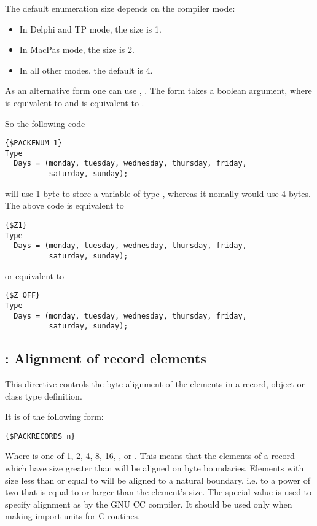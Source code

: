 The default enumeration size depends on the compiler mode:
\begin{itemize}
\item In Delphi and TP mode, the size is 1.
\item In MacPas mode, the size is 2.
\item In all other modes, the default is 4.
\end{itemize}

As an alternative form one can use , 
. The  form takes a boolean argument, 
where  is equivalent to  and  is 
equivalent to .

So the following code
\begin{verbatim}
{$PACKENUM 1}
Type
  Days = (monday, tuesday, wednesday, thursday, friday,
          saturday, sunday);
\end{verbatim}
will use 1 byte to store a variable of type , whereas it nomally
would use 4 bytes. The above code is equivalent to
\begin{verbatim}
{$Z1}
Type
  Days = (monday, tuesday, wednesday, thursday, friday,
          saturday, sunday);
\end{verbatim}
or equivalent to
\begin{verbatim}
{$Z OFF}
Type
  Days = (monday, tuesday, wednesday, thursday, friday,
          saturday, sunday);
\end{verbatim}

\subsection{ : Alignment of record elements}
\label{se:Packrecords}
This directive controls the byte alignment of the elements in a record,
object or class type definition.

It is of the following form:
\begin{verbatim}
{$PACKRECORDS n}
\end{verbatim}

Where  is one of 1, 2, 4, 8, 16, ,  or .
This means that the elements of a record which have size greater than 
will be aligned on  byte boundaries. Elements with size less than or
equal to  will be aligned to a natural boundary, i.e. to a power of
two that is equal to or larger than the element's size. The special value 
 is used to specify alignment as by the GNU CC compiler. It should 
be used only when making import units for C routines.


